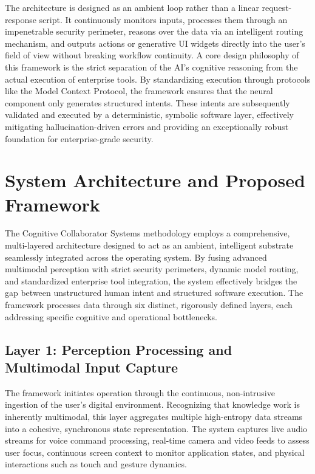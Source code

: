 \documentclass[12pt, a4paper]{report}
\begin{document}
The architecture is designed as an ambient loop rather than a linear request-response script. It continuously monitors inputs, processes them through an impenetrable security perimeter, reasons over the data via an intelligent routing mechanism, and outputs actions or generative UI widgets directly into the user's field of view without breaking workflow continuity.\cite{hojo2025} A core design philosophy of this framework is the strict separation of the AI's cognitive reasoning from the actual execution of enterprise tools. By standardizing execution through protocols like the Model Context Protocol, the framework ensures that the neural component only generates structured intents. These intents are subsequently validated and executed by a deterministic, symbolic software layer, effectively mitigating hallucination-driven errors and providing an exceptionally robust foundation for enterprise-grade security.\cite{hojo2025}


\chapter{System Architecture and Proposed Framework}

The Cognitive Collaborator Systems methodology employs a comprehensive, multi-layered architecture designed to act as an ambient, intelligent substrate seamlessly integrated across the operating system. By fusing advanced multimodal perception with strict security perimeters, dynamic model routing, and standardized enterprise tool integration, the system effectively bridges the gap between unstructured human intent and structured software execution.\cite{hojo2025} The framework processes data through six distinct, rigorously defined layers, each addressing specific cognitive and operational bottlenecks.

\section{Layer 1: Perception Processing and Multimodal Input Capture}
The framework initiates operation through the continuous, non-intrusive ingestion of the user's digital environment.\cite{hojo2025} Recognizing that knowledge work is inherently multimodal, this layer aggregates multiple high-entropy data streams into a cohesive, synchronous state representation. The system captures live audio streams for voice command processing, real-time camera and video feeds to assess user focus, continuous screen context to monitor application states, and physical interactions such as touch and gesture dynamics.\cite{hojo2025}
\end{document}
